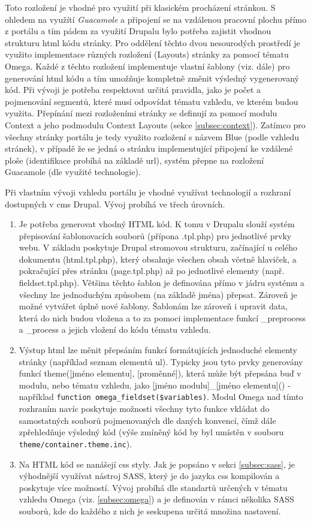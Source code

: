 Toto rozložení je vhodné pro využití při klasickém procházení stránkou. S ohledem na využítí \emph{Guacamole} a připojení se na vzdálenou pracovní plochu přímo z portálu a tím pádem za využití Drupalu bylo potřeba zajistit vhodnou strukturu html kódu stránky. Pro oddělení těchto dvou nesourodých prostředí je využito implementace různých rozložení (Layouts) stránky za pomocí tématu Omega. Každé z těchto rozložení implementuje vlastní šablony (viz. dále) pro generování html kódu a tím umožňuje kompletně změnit výsledný vygenerovaný kód. Při vývoji je potřeba respektovat určitá pravidla, jako je počet a pojmenování segmentů, které musí odpovídat tématu vzhledu, ve kterém budou využita. Přepínání mezi rozloženími stránky se definují za pomocí modulu Context a jeho podmodulu Context Layouts (sekce \ref{subsec:context}). Zatímco pro všechny stránky portálu je tedy využito rozložení s názvem Blue (podle vzhledu stránek), v případě že se jedná o stránku implementující připojení ke vzdálené ploše (identifikace probíhá na základě \gls{url}), systém přepne na rozložení Guacamole (dle využité technologie).

Při vlastním vývoji vzhledu portálu je vhodné využívat technologií a rozhraní dostupných v \gls{cms} Drupal. Vývoj probíhá ve třech úrovních.

\begin{enumerate}
  \item Je potřeba generovat vhodný HTML kód. K tomu v Drupalu slouží systém přepisování šablonovacích souborů (přípona .tpl.php) pro jednotlivé prvky webu. V základu poskytuje Drupal stromovou strukturu, začínající u celého dokumentu (html.tpl.php), který obsahuje všechen obsah včetně hlaviček, a pokračující přes stránku (page.tpl.php) až po jednotlivé elementy (např. fieldset.tpl.php). Většina těchto šablon je definována přímo v jádru systému a všechny lze jednoduchým způsobem (na základě jména) přepsat. Zároveň je možné vytvářet úplně nové šablony. Šablonám lze zároveň i upravit data, která do nich budou vložena a to za pomoci implementace funkcí \_preprocess a \_process a jejich vložení do kódu tématu vzhledu. 
  
  \item Výstup html lze měnit přepsáním funkcí formátujících jednoduché elementy stránky (například seznam elementů ul). Typicky jsou tyto prvky generovány funkcí theme([jméno elementu], [proměnné]), která může být přepsána buď v modulu, nebo tématu vzhledu, jako [jméno modulu]\_[jméno elementu]() - například \texttt{function omega\_fieldset(\$variables)}. Modul Omega nad tímto rozhraním navíc poskytuje možnosti všechny tyto funkce vkládat do samostatných souborů pojmenovaných dle daných konvencí, čímž dále zpřehledňuje výsledný kód (výše zmíněný kód by byl umístěn v souboru \texttt{theme/container.theme.inc}).
  \item Na HTML kód se nanášejí \gls{css} styly. Jak je popsáno v sekci \ref{subsec:sass}, je výhodnější využívat nástroj SASS, který je do jazyka \gls{css} kompilován a poskytuje více možností. Vývoj probíhá dle standartů určených v tématu vzhledu Omega (viz. \ref{subsec:omega}) a je definován v rámci několika SASS souborů, kde do každého z nich je seskupena určitá množina nastavení.
\end{enumerate}

